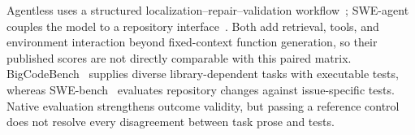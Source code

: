 Agentless uses a structured localization--repair--validation workflow~\cite{xia2024agentless}; SWE-agent couples the model to a repository interface~\cite{yang2024sweagent}. Both add retrieval, tools, and environment interaction beyond fixed-context function generation, so their published scores are not directly comparable with this paired matrix. BigCodeBench~\cite{zhuo2024bigcodebench} supplies diverse library-dependent tasks with executable tests, whereas SWE-bench~\cite{jimenez2023swebench,swebenchdocs2026} evaluates repository changes against issue-specific tests. Native evaluation strengthens outcome validity, but passing a reference control does not resolve every disagreement between task prose and tests.


